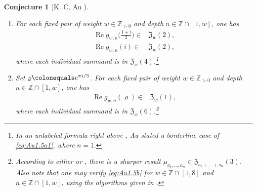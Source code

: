\documentclass[final,notitlepage,12pt,reqno]{amsart}
\DeclareMathOperator{\R}{Re}
\theoremstyle{plain}
\newtheorem{conjecture}[theorem]{Conjecture}
\theoremstyle{definition}
\numberwithin{equation}{section}
\begin{document}
\begin{conjecture}[K. C. Au {\cite[Conjecture 1.5]{Au2022a}}]\label{conj:Au1.5}\begin{enumerate}[leftmargin=*,  label=\emph{(\alph*)},ref=(\alph*),
widest=d, align=left] \item
For each fixed pair of weight $w\in\mathbb Z_{>0}$ and depth $ n\in\mathbb Z\cap[1,w]$, one has  {\allowdisplaybreaks
\begin{align}
\R g_{w,n}\bigg( \frac{1+i}{2} \bigg)\in{}&\mathfrak Z_w(2),\label{eq:Au1.5a1}\\\R g_{w,n}( i )\in{}&\mathfrak Z_w(2),\label{eq:Au1.5a2}
\end{align}
}where each individual summand is in $ \mathfrak Z_w(4)$.\footnote{In an unlabeled formula right above  \cite[Conjecture 1.5]{Au2022a}, Au stated a borderline case of \eqref{eq:Au1.5a1}, where $n=1$.}
\item Set $ \varrho\colonequals  e^{\pi i/3}$. For each fixed pair of weight $w\in\mathbb Z_{>0}$ and depth $ n\in\mathbb Z\cap[1,w]$, one has \begin{align}
\R g_{w,n}(\varrho)\in{}&\mathfrak Z_w(1),\label{eq:Au1.5b}
\end{align}where each individual summand is in $ \mathfrak Z_w(6)$.\footnote{\label{fn:desc3}According to either \cite[Example 3.9]{Au2022a} or \cite[Proposition 3.3]{SunZhou2026MCV}, there is a sharper result $ \mu_{a_1,\dots, a_n}\in\mathfrak Z_{a_1+\dots+a_n}(3)$.  Also note that one may verify \eqref{eq:Au1.5b} for $ w\in\mathbb Z\cap[1,8]$ and $ n\in\mathbb Z\cap[1,w]$, using the algorithms given in \cite[\S\S3.1--3.2]{SunZhou2026MCV}. }
 \end{enumerate}
\end{conjecture}
\end{document}
